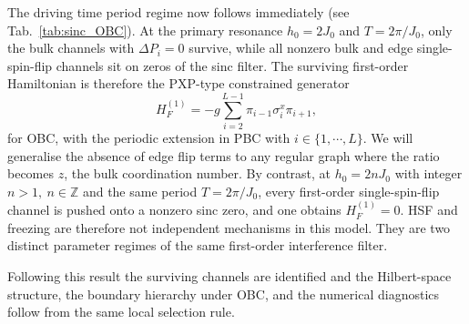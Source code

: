 \documentclass[aps,prb,reprint,twocolumn,amsmath,amssymb,citeautoscript]{revtex4-2}
\begin{document}
The driving time period regime now follows immediately (see Tab.~\ref{tab:sinc_OBC}). At the primary resonance
$h_0=2J_0$ and $T=2\pi/J_0$, only the bulk channels with $\Delta P_i=0$ survive, while all nonzero bulk and edge single-spin-flip channels sit on zeros of the sinc filter. The surviving first-order Hamiltonian is therefore the PXP-type constrained generator \begin{equation}
    H_F^{(1)}=-g\sum_{i=2}^{L-1}\pi_{i-1}\sigma_i^x\pi_{i+1},
    \label{eq:Heff_PXP_OBC}
\end{equation} 
for OBC, with the periodic extension in PBC with $i\in\{1, \cdots,L\}$. We will generalise the absence of edge flip terms to any regular graph where the ratio becomes $z$, the bulk coordination number. By contrast, at $h_0=2nJ_0$ with integer $n>1,~n\in \mathbb{Z}$ and the same period $T=2\pi/J_0$, every first-order single-spin-flip channel is pushed onto a nonzero sinc zero, and one obtains $H_F^{(1)}=0$. HSF and freezing are therefore not independent mechanisms in this model. They are two distinct parameter regimes of the same first-order interference filter.

Following this result the surviving channels are identified and the Hilbert-space structure, the boundary hierarchy under OBC, and the numerical diagnostics follow from the same local selection rule.
\end{document}
